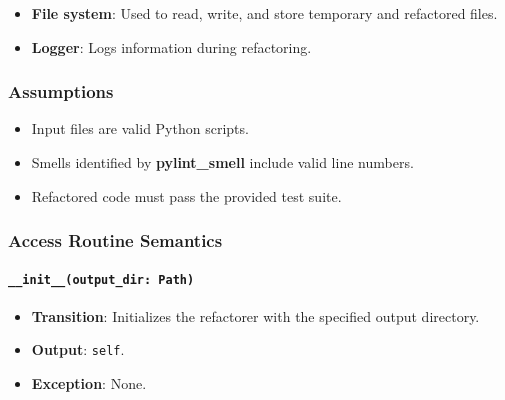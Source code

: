 \documentclass[12pt, titlepage]{article}
\begin{document}
\begin{itemize}
  \item \textbf{File system}: Used to read, write, and store temporary and refactored files.

  \item \textbf{Logger}: Logs information during refactoring.
  
\end{itemize}

\subsubsection{Assumptions}

\begin{itemize}
  \item Input files are valid Python scripts.
  \item Smells identified by \textbf{pylint\_smell} include valid line numbers.
  \item Refactored code must pass the provided test suite.
\end{itemize}
\subsubsection{Access Routine Semantics}

\paragraph{\texttt{\_\_init\_\_(output\_dir: Path)}}
\begin{itemize}
\item \textbf{Transition}: Initializes the refactorer with the specified output directory.
\item \textbf{Output}: \texttt{self}.
\item \textbf{Exception}: None.
\end{itemize}
\end{document}
